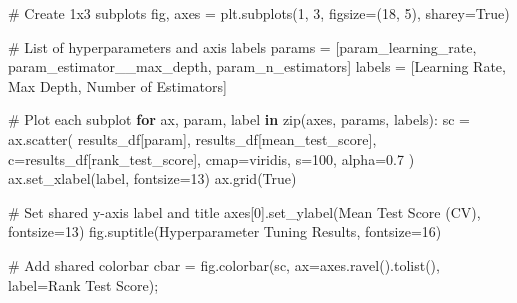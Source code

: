 \documentclass[
  letterpaper,
  DIV=11,
  numbers=noendperiod]{scrreprt}
\newenvironment{Shaded}{\begin{snugshade}}{\end{snugshade}}
\newcommand{\BuiltInTok}[1]{\textcolor[rgb]{0.00,0.23,0.31}{#1}}
\newcommand{\CommentTok}[1]{\textcolor[rgb]{0.37,0.37,0.37}{#1}}
\newcommand{\ControlFlowTok}[1]{\textcolor[rgb]{0.00,0.23,0.31}{\textbf{#1}}}
\newcommand{\DecValTok}[1]{\textcolor[rgb]{0.68,0.00,0.00}{#1}}
\newcommand{\FloatTok}[1]{\textcolor[rgb]{0.68,0.00,0.00}{#1}}
\newcommand{\KeywordTok}[1]{\textcolor[rgb]{0.00,0.23,0.31}{\textbf{#1}}}
\newcommand{\NormalTok}[1]{\textcolor[rgb]{0.00,0.23,0.31}{#1}}
\newcommand{\OperatorTok}[1]{\textcolor[rgb]{0.37,0.37,0.37}{#1}}
\newcommand{\StringTok}[1]{\textcolor[rgb]{0.13,0.47,0.30}{#1}}
\newcommand{\VariableTok}[1]{\textcolor[rgb]{0.07,0.07,0.07}{#1}}
\begin{document}
\begin{Shaded}
\begin{Highlighting}[]
\CommentTok{\# Create 1x3 subplots}
\NormalTok{fig, axes }\OperatorTok{=}\NormalTok{ plt.subplots(}\DecValTok{1}\NormalTok{, }\DecValTok{3}\NormalTok{, figsize}\OperatorTok{=}\NormalTok{(}\DecValTok{18}\NormalTok{, }\DecValTok{5}\NormalTok{), sharey}\OperatorTok{=}\VariableTok{True}\NormalTok{)}

\CommentTok{\# List of hyperparameters and axis labels}
\NormalTok{params }\OperatorTok{=}\NormalTok{ [}\StringTok{\textquotesingle{}param\_learning\_rate\textquotesingle{}}\NormalTok{, }\StringTok{\textquotesingle{}param\_estimator\_\_max\_depth\textquotesingle{}}\NormalTok{, }\StringTok{\textquotesingle{}param\_n\_estimators\textquotesingle{}}\NormalTok{]}
\NormalTok{labels }\OperatorTok{=}\NormalTok{ [}\StringTok{\textquotesingle{}Learning Rate\textquotesingle{}}\NormalTok{, }\StringTok{\textquotesingle{}Max Depth\textquotesingle{}}\NormalTok{, }\StringTok{\textquotesingle{}Number of Estimators\textquotesingle{}}\NormalTok{]}

\CommentTok{\# Plot each subplot}
\ControlFlowTok{for}\NormalTok{ ax, param, label }\KeywordTok{in} \BuiltInTok{zip}\NormalTok{(axes, params, labels):}
\NormalTok{    sc }\OperatorTok{=}\NormalTok{ ax.scatter(}
\NormalTok{        results\_df[param],}
\NormalTok{        results\_df[}\StringTok{\textquotesingle{}mean\_test\_score\textquotesingle{}}\NormalTok{],}
\NormalTok{        c}\OperatorTok{=}\NormalTok{results\_df[}\StringTok{\textquotesingle{}rank\_test\_score\textquotesingle{}}\NormalTok{],}
\NormalTok{        cmap}\OperatorTok{=}\StringTok{\textquotesingle{}viridis\textquotesingle{}}\NormalTok{,}
\NormalTok{        s}\OperatorTok{=}\DecValTok{100}\NormalTok{,}
\NormalTok{        alpha}\OperatorTok{=}\FloatTok{0.7}
\NormalTok{    )}
\NormalTok{    ax.set\_xlabel(label, fontsize}\OperatorTok{=}\DecValTok{13}\NormalTok{)}
\NormalTok{    ax.grid(}\VariableTok{True}\NormalTok{)}

\CommentTok{\# Set shared y{-}axis label and title}
\NormalTok{axes[}\DecValTok{0}\NormalTok{].set\_ylabel(}\StringTok{\textquotesingle{}Mean Test Score (CV)\textquotesingle{}}\NormalTok{, fontsize}\OperatorTok{=}\DecValTok{13}\NormalTok{)}
\NormalTok{fig.suptitle(}\StringTok{\textquotesingle{}Hyperparameter Tuning Results\textquotesingle{}}\NormalTok{, fontsize}\OperatorTok{=}\DecValTok{16}\NormalTok{)}

\CommentTok{\# Add shared colorbar}
\NormalTok{cbar }\OperatorTok{=}\NormalTok{ fig.colorbar(sc, ax}\OperatorTok{=}\NormalTok{axes.ravel().tolist(), label}\OperatorTok{=}\StringTok{\textquotesingle{}Rank Test Score\textquotesingle{}}\NormalTok{)}\OperatorTok{;}
\end{Highlighting}
\end{Shaded}
\end{document}

